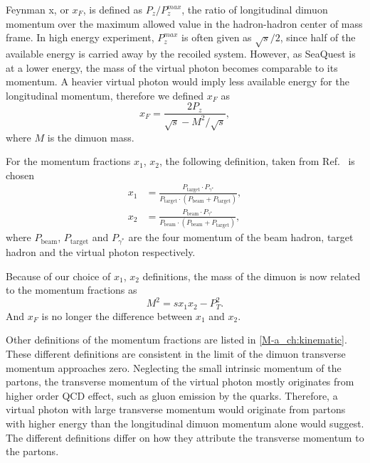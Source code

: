 \documentclass[../main.tex]{subfiles}
\begin{document}
Feynman x, or $x_F$, is defined as $P_z/P_z^{max}$, the ratio of longitudinal dimuon momentum
over the maximum allowed value in the hadron-hadron center of mass frame. In high energy
experiment, $P_z^{max}$ is often given as $\sqrt{s}/2$, since half of the available energy is
carried away by the recoiled system.
However, as SeaQuest is at a lower energy, the mass of the virtual photon becomes comparable to its momentum.
A heavier virtual photon would imply less available energy for the longitudinal momentum,
therefore we defined $x_F$ as
\begin{equation}
	x_F = \frac{2P_z}{\sqrt{s}-M^2/\sqrt{s}},
\end{equation}
where $M$ is the dimuon mass.

For the momentum fractions $x_1$, $x_2$, the following definition, taken from Ref.~\cite{Coester-1286} is chosen
\begin{equation}
	\begin{split}
		x_1 &= \frac{P_{\textrm{target}}\cdot P_{\gamma^*}}{P_{\textrm{target}}\cdot (P_{\textrm{beam}}+P_{\textrm{target}})},\\
		x_2 &= \frac{P_{\textrm{beam}}\cdot P_{\gamma^*}}{P_{\textrm{beam}}\cdot (P_{\textrm{beam}}+P_{\textrm{target}})},
	\end{split}
\end{equation}
where $P_{\textrm{beam}}$, $P_{\textrm{target}}$ and $P_{\gamma^*}$ are the four momentum of the
beam hadron, target hadron and the virtual photon respectively.

Because of our choice of $x_1$, $x_2$ definitions, the mass of the dimuon is now related to
the momentum fractions as
\begin{equation}
	M^2= sx_1x_2-P_T^2.
\end{equation}
And $x_F$ is no longer the difference between $x_1$ and $x_2$.

Other definitions of the momentum fractions are listed in \cref{M-a_ch:kinematic}. These different definitions
are consistent in the limit of the dimuon transverse momentum approaches zero.
Neglecting the small intrinsic momentum of the partons,
the transverse momentum of the virtual photon mostly originates from higher order QCD effect, such as gluon
emission by the quarks. Therefore, a virtual photon with large transverse momentum would originate
from partons with higher energy than the longitudinal dimuon momentum alone would suggest. The different
definitions differ on how they attribute the transverse momentum to the partons.
\end{document}
